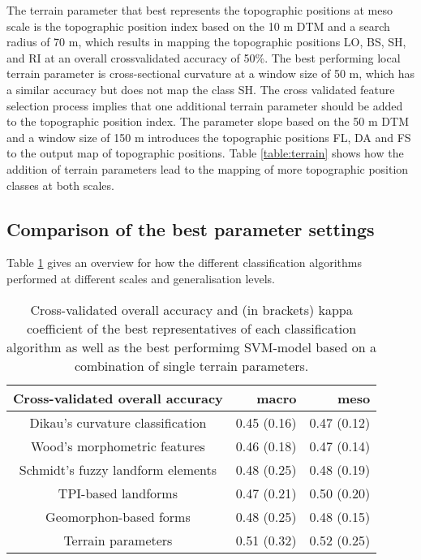 \documentclass[preprint,12pt,authoryear]{elsarticle}
\begin{document}
The terrain parameter that best represents the topographic positions at meso scale is the topographic position index based on the 10 m DTM and a search radius of 70 m, which results in mapping the topographic positions LO, BS, SH, and RI at an overall crossvalidated accuracy of 50\%. The best performing local terrain parameter is cross-sectional curvature at a window size of 50 m, which has a similar accuracy but does not map the class SH. The cross validated feature selection process implies that one additional terrain parameter should be added to the topographic position index. The parameter slope based on the 50 m DTM and a window size of 150 m introduces the topographic positions FL, DA and FS to the output map of topographic positions. Table \ref{table:terrain} shows how the addition of terrain parameters lead to the mapping of more topographic position classes at both scales.

\clearpage
\subsection{Comparison of the best parameter settings}
Table \ref{table:overall_comparison} gives an overview for how the different classification algorithms performed at different scales and generalisation levels.

\begin{table}[ht]
\caption{Cross-validated overall accuracy and (in brackets) kappa coefficient of the best representatives of each classification algorithm as well as the best performimg SVM-model based on a combination of single terrain parameters. }
\centering
\begin{tabular}{crr}
  \hline
Cross-validated overall accuracy & macro   & meso \\ 
  \hline 
Dikau's curvature classification & 0.45 (0.16)  & 0.47 (0.12)  \\ 
  Wood's morphometric features & 0.46 (0.18)  & 0.47 (0.14)  \\ 
  Schmidt's fuzzy landform elements & 0.48 (0.25)  & 0.48 (0.19)  \\ 
  TPI-based landforms & 0.47 (0.21)  & 0.50 (0.20)  \\ 
  Geomorphon-based forms & 0.48 (0.25)  & 0.48 (0.15)  \\ 
  Terrain parameters & 0.51 (0.32)  & 0.52 (0.25)  \\ 
   \hline
\end{tabular}
\label{table:overall_comparison}
\end{table}
\end{document}
